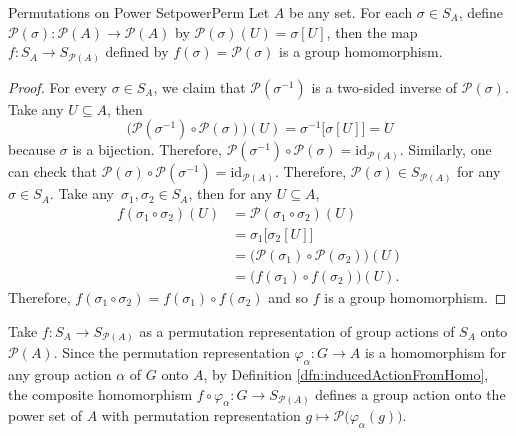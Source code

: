 \documentclass[math]{amznotes}
\theoremstyle{remark}
\newcommand{\0}{\mathbf{0}}
\newcommand{\1}{\mathbf{1}}
\begin{document}
\begin{probox}{Permutations on Power Set}{powerPerm}
    Let $A$ be any set. For each $\sigma \in S_A$, define $\mathcal{P}\left(\sigma\right) \colon \mathcal{P}\left(A\right) \to \mathcal{P}\left(A\right)$ by $\mathcal{P}\left(\sigma\right)\left(U\right) = \sigma\left[U\right]$, then the map $f \colon S_A \to S_{\mathcal{P}\left(A\right)}$ defined by $f\left(\sigma\right) = \mathcal{P}\left(\sigma\right)$ is a group homomorphism.
    \tcblower
    \begin{proof}
        For every $\sigma \in S_A$, we claim that $\mathcal{P}\left(\sigma^{-1}\right)$ is a two-sided inverse of $\mathcal{P}\left(\sigma\right)$. Take any $U \subseteq A$, then 
        \begin{equation*}
            \bigl(\mathcal{P}\left(\sigma^{-1}\right) \circ \mathcal{P}\left(\sigma\right)\bigr)\left(U\right) = \sigma^{-1}\bigl[\sigma\left[U\right]\bigr] = U
        \end{equation*}
        because $\sigma$ is a bijection. Therefore, $\mathcal{P}\left(\sigma^{-1}\right) \circ \mathcal{P}\left(\sigma\right) = \mathrm{id}_{\mathcal{P}\left(A\right)}$. Similarly, one can check that $\mathcal{P}\left(\sigma\right) \circ \mathcal{P}\left(\sigma^{-1}\right) = \mathrm{id}_{\mathcal{P}\left(A\right)}$. Therefore, $\mathcal{P}\left(\sigma\right) \in S_{\mathcal{P}\left(A\right)}$ for any $\sigma \in S_A$. Take any~$\sigma_1, \sigma_2 \in S_A$, then for any $U \subseteq A$, 
        \begin{align*}
            f\left(\sigma_1 \circ \sigma_2\right)\left(U\right) & = \mathcal{P}\left(\sigma_1 \circ \sigma_2\right)\left(U\right) \\
            & = \sigma_1\bigl[\sigma_2\left[U\right]\bigr] \\
            & = \bigl(\mathcal{P}\left(\sigma_1\right) \circ \mathcal{P}\left(\sigma_2\right)\bigr)\left(U\right) \\
            & = \bigl(f\left(\sigma_1\right) \circ f\left(\sigma_2\right)\bigr)\left(U\right).
        \end{align*}
        Therefore, $f\left(\sigma_1 \circ \sigma_2\right) = f\left(\sigma_1\right) \circ f\left(\sigma_2\right)$ and so $f$ is a group homomorphism.
    \end{proof}
\end{probox}
Take $f \colon S_A \to S_{\mathcal{P}\left(A\right)}$ as a permutation representation of group actions of $S_A$ onto $\mathcal{P}\left(A\right)$. Since the permutation representation $\varphi_{\alpha} \colon G \to A$ is a homomorphism for any group action $\alpha$ of $G$ onto $A$, by Definition \ref{dfn:inducedActionFromHomo}, the composite homomorphism $f \circ \varphi_{\alpha} \colon G \to S_{\mathcal{P}\left(A\right)}$ defines a group action onto the power set of $A$ with permutation representation $g \mapsto \mathcal{P}\bigl(\varphi_{\alpha}\left(g\right)\bigr)$.
\end{document}
